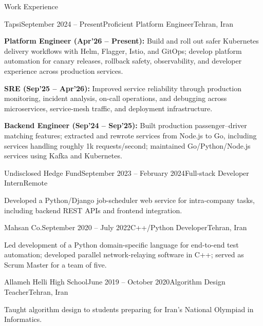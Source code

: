 \documentclass[11pt]{resume}
\begin{document}
\begin{rSection}{Work Experience}
  \vspace{4pt}
  \begin{rSubsection}{Tapsi}{September 2024 -- Present}{Proficient Platform Engineer}{Tehran, Iran}
    \item \textbf{Platform Engineer (Apr'26 -- Present):} Build and roll out safer Kubernetes delivery workflows with Helm, Flagger, Istio, and GitOps; develop platform automation for canary releases, rollback safety, observability, and developer experience across production services.
    \item \textbf{SRE (Sep'25 -- Apr'26):} Improved service reliability through production monitoring, incident analysis, on-call operations, and debugging across microservices, service-mesh traffic, and deployment infrastructure.
    \item \textbf{Backend Engineer (Sep'24 -- Sep'25):} Built production passenger--driver matching features; extracted and rewrote services from Node.js to Go, including services handling roughly 1k requests/second; maintained Go/Python/Node.js services using Kafka and Kubernetes.
  \end{rSubsection}

  \begin{rSubsection}{Undisclosed Hedge Fund}{September 2023 -- February 2024}{Full-stack Developer Intern}{Remote}
    \item Developed a Python/Django job-scheduler web service for intra-company tasks, including backend REST APIs and frontend integration.
  \end{rSubsection}

  \begin{rSubsection}{Mahsan Co.}{September 2020 -- July 2022}{C++/Python Developer}{Tehran, Iran}
    \item Led development of a Python domain-specific language for end-to-end test automation; developed parallel network-relaying software in C++; served as Scrum Master for a team of five.
  \end{rSubsection}

  \begin{rSubsection}{Allameh Helli High School}{June 2019 -- October 2020}{Algorithm Design Teacher}{Tehran, Iran}
    \item Taught algorithm design to students preparing for Iran's National Olympiad in Informatics.
  \end{rSubsection}
\end{rSection}
\end{document}
